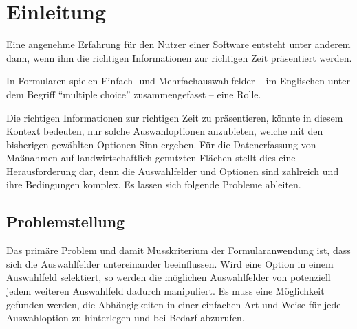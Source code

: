 \chapter{Einleitung}

Eine angenehme Erfahrung für den Nutzer einer Software entsteht unter anderem dann,
wenn ihm die richtigen Informationen zur richtigen Zeit präsentiert werden.

In Formularen spielen Einfach- und Mehrfachauswahlfelder
-- im Englischen unter dem Begriff \enquote{multiple choice} zusammengefasst -- eine Rolle.



Die richtigen Informationen zur richtigen Zeit zu präsentieren, könnte in diesem Kontext bedeuten,
nur solche Auswahloptionen anzubieten,
welche mit den bisherigen gewählten Optionen Sinn ergeben.
Für die Datenerfassung von Maßnahmen auf landwirtschaftlich genutzten Flächen stellt dies eine Herausforderung dar,
denn die Auswahlfelder und Optionen sind zahlreich und ihre Bedingungen komplex.
Es lassen sich folgende Probleme ableiten. 

\section{Problemstellung}

Das primäre Problem und damit Musskriterium der Formularanwendung ist,
dass sich die Auswahlfelder untereinander beeinflussen.
Wird eine Option in einem Auswahlfeld selektiert,
so werden die möglichen Auswahlfelder von potenziell jedem weiteren Auswahlfeld dadurch manipuliert.
Es muss eine Möglichkeit gefunden werden,
die Abhängigkeiten in einer einfachen Art und Weise für jede Auswahloption zu hinterlegen und bei Bedarf abzurufen.


